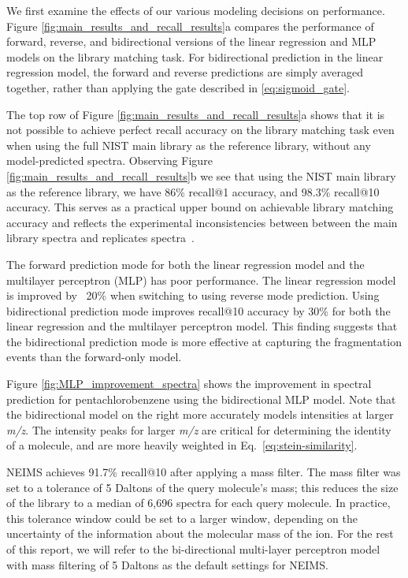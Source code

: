 We first examine the effects of our various modeling decisions on performance. Figure \ref{fig:main_results_and_recall_results}a compares the performance of forward, reverse, and bidirectional versions of the linear regression and MLP models on the library matching task. For bidirectional prediction in the linear regression model, the forward and reverse predictions are simply averaged together, rather than applying the gate described in \eqref{eq:sigmoid_gate}.

The top row of Figure \ref{fig:main_results_and_recall_results}a shows that it is not possible to achieve perfect recall accuracy on the library matching task even when using the full NIST main library as the reference library, without any model-predicted spectra. Observing Figure \ref{fig:main_results_and_recall_results}b we see that using the NIST main library as the reference library, we have 86\% recall@1 accuracy, and 98.3\% recall@10 accuracy. This serves as a practical upper bound on achievable library matching accuracy and reflects the experimental inconsistencies between between the main library spectra and replicates spectra~\cite{stein2012MassLibReview}.

The forward prediction mode for both the linear regression model and the multilayer perceptron (MLP) has poor performance. The linear regression model is improved by ~20\% when switching to using  reverse mode prediction. Using  bidirectional prediction mode improves  recall@10 accuracy by 30\% for both the linear regression and the multilayer perceptron model. This finding suggests that the bidirectional prediction mode is more effective at capturing the fragmentation events than the forward-only model.

Figure \ref{fig:MLP_improvement_spectra} shows the improvement in spectral prediction for pentachlorobenzene using the bidirectional MLP model. Note that the bidirectional model on the right more accurately models intensities at larger \textit{m/z}. The intensity peaks for larger \textit{m/z} are critical for determining the identity of a molecule, and are more heavily weighted in Eq.~\eqref{eq:stein-similarity}.

NEIMS achieves 91.7\% recall@10 after applying a mass filter. The mass filter was set to a tolerance of 5 Daltons of the query molecule's mass; this reduces the size of the library to a median of 6,696 spectra for each query molecule. In practice, this tolerance window could be set to a larger window, depending on the uncertainty of the information about the molecular mass of the ion.
For the rest of this report, we will refer to the bi-directional multi-layer perceptron model with mass filtering of 5 Daltons as the default settings for NEIMS.

